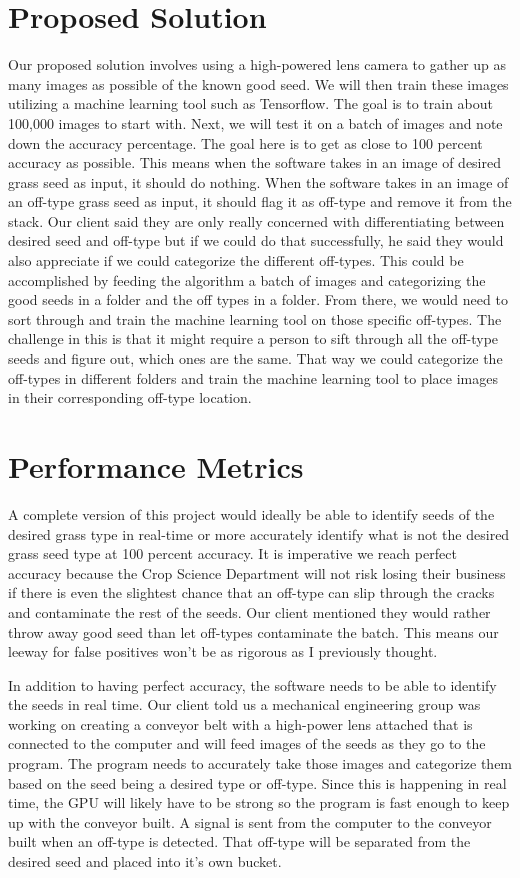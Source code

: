 \documentclass[onecolumn, draftclsnofoot,10pt, compsoc]{IEEEtran}
\begin{document}
\section{Proposed Solution}
	Our proposed solution involves using a high-powered lens camera to gather up as many images as possible of the known good seed. We will then train these images utilizing a machine learning tool such as Tensorflow. The goal is to train about 100,000 images to start with. Next, we will test it on a batch of images and note down the accuracy percentage. The goal here is to get as close to 100 percent accuracy as possible. This means when the software takes in an image of desired grass seed as input, it should do nothing. When the software takes in an image of an off-type grass seed as input, it should flag it as off-type and remove it from the stack. Our client said they are only really concerned with differentiating between desired seed and off-type but if we could do that successfully, he said they would also appreciate if we could categorize the different off-types. This could be accomplished by feeding the algorithm a batch of images and categorizing the good seeds in a folder and the off types in a folder. From there, we would need to sort through and train the machine learning tool on those specific off-types. The challenge in this is that it might require a person to sift through all the off-type seeds and figure out, which ones are the same. That way we could categorize the off-types in different folders and train the machine learning tool to place images in their corresponding off-type location. 
\section{Performance Metrics}
	A complete version of this project would ideally be able to identify seeds of the desired grass type in real-time or more accurately identify what is not the desired grass seed type at 100 percent accuracy. It is imperative we reach perfect accuracy because the Crop Science Department will not risk losing their business if there is even the slightest chance that an off-type can slip through the cracks and contaminate the rest of the seeds. Our client mentioned they would rather throw away good seed than let off-types contaminate the batch. This means our leeway for false positives won’t be as rigorous as I previously thought. 

	In addition to having perfect accuracy, the software needs to be able to identify the seeds in real time. Our client told us a mechanical engineering group was working on creating a conveyor belt with a high-power lens attached that is connected to the computer and will feed images of the seeds as they go to the program. The program needs to accurately take those images and categorize them based on the seed being a desired type or off-type. Since this is happening in real time, the GPU will likely have to be strong so the program is fast enough to keep up with the conveyor built. A signal is sent from the computer to the conveyor built when an off-type is detected. That off-type will be separated from the desired seed and placed into it’s own bucket. 
\end{document}
